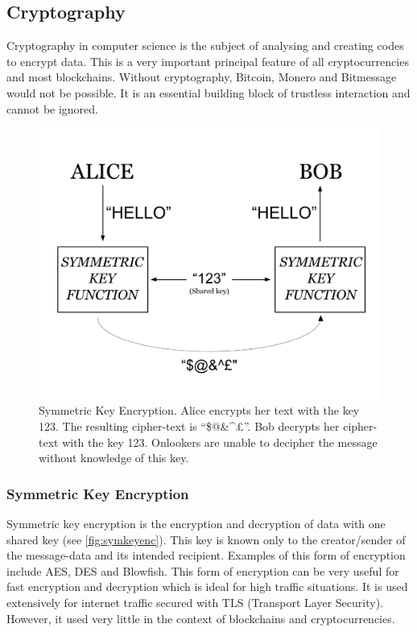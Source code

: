 \documentclass{article}
\begin{document}
\newpage

\subsection{Cryptography}
Cryptography in computer science is the subject of analysing and creating codes to encrypt data. This is a very important principal feature of all cryptocurrencies and most blockchains. Without cryptography, Bitcoin, Monero and Bitmessage would not be possible. It is an essential building block of trustless interaction and cannot be ignored.

\begin{figure}[h]
    \centering
    \includegraphics[width=0.5\linewidth]{Images/Diagrams/symmetric_key_encryption.png}
    \caption{Symmetric Key Encryption. Alice encrypts her text with the key 123. The resulting cipher-text is ``\$@\&\textasciicircum£''. Bob decrypts her cipher-text with the key 123. Onlookers are unable to decipher the message without knowledge of this key.}
    \label{fig:symkeyenc}
\end{figure}
\subsubsection{Symmetric Key Encryption}
Symmetric key encryption is the encryption and decryption of data with one shared key (see \autoref{fig:symkeyenc}). This key is known only to the creator/sender of the message-data and its intended recipient.
Examples of this form of encryption include AES\cite{aes}, DES and Blowfish. This form of encryption can be very useful for fast encryption and decryption which is ideal for high traffic situations. It is used extensively for internet traffic secured with TLS (Transport Layer Security). However, it used very little in the context of blockchains and cryptocurrencies.
\end{document}
